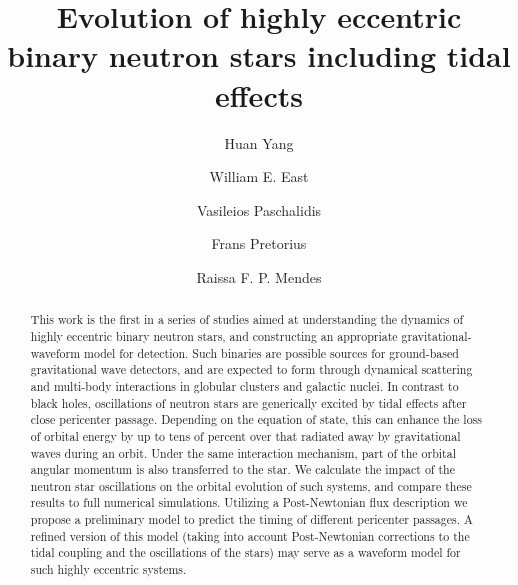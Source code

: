 \documentclass[prd,aps,floatfix,superscriptaddress,nofootinbib,twocolumn,10pt,English]{revtex4}
\begin{document}
  

\title{Evolution of highly eccentric binary neutron stars including tidal effects}

\author{ Huan Yang}
\author{William E. East}
\author{Vasileios Paschalidis}
\author{Frans Pretorius}
\author{Raissa F. P. Mendes}


\begin{abstract} 
This work is the first in a series of studies aimed at understanding the
dynamics of highly eccentric binary neutron stars, and constructing
an appropriate gravitational-waveform model for detection. Such binaries
are possible sources for ground-based gravitational wave detectors, and are
expected to form through dynamical scattering and multi-body interactions
in globular clusters and galactic nuclei. In contrast to black holes,
oscillations of neutron stars are generically excited by tidal effects
after close pericenter passage.  Depending on the equation of state,
this can enhance the loss of orbital energy by up to tens of percent 
over that radiated away by gravitational waves 
during an orbit. Under the same interaction mechanism, part of the orbital
angular momentum is also transferred to the star. We calculate the impact
of the neutron star oscillations on the orbital evolution of such systems,
and compare these results to full numerical simulations.  Utilizing a
Post-Newtonian flux description we propose a preliminary model to predict
the timing of different pericenter passages. A refined version of this
model (taking into account Post-Newtonian corrections to the tidal coupling
and the oscillations of the stars) may serve as a waveform model for such
highly eccentric systems.
\end{abstract}

\maketitle 
\end{document}
